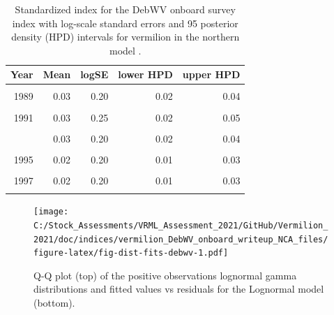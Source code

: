 \documentclass[11pt,
  english,
  a4paper,
]{article}
\begin{document}
\FloatBarrier

\begin{table}

\caption{\label{tab:tab-index-debwv}Standardized index for the DebWV onboard survey index with log-scale standard errors and 95%
       posterior density (HPD) intervals for vermilion in the northern model .}
\centering
\begin{tabular}[t]{rrrrr}
\toprule
Year & Mean & logSE & lower HPD & upper HPD\\
\midrule
\cellcolor{gray!6}{1988} & \cellcolor{gray!6}{0.02} & \cellcolor{gray!6}{0.22} & \cellcolor{gray!6}{0.01} & \cellcolor{gray!6}{0.03}\\
1989 & 0.03 & 0.20 & 0.02 & 0.04\\
\cellcolor{gray!6}{1990} & \cellcolor{gray!6}{0.06} & \cellcolor{gray!6}{0.23} & \cellcolor{gray!6}{0.04} & \cellcolor{gray!6}{0.10}\\
1991 & 0.03 & 0.25 & 0.02 & 0.05\\
\cellcolor{gray!6}{1992} & \cellcolor{gray!6}{0.02} & \cellcolor{gray!6}{0.20} & \cellcolor{gray!6}{0.01} & \cellcolor{gray!6}{0.03}\\
\addlinespace
1993 & 0.03 & 0.20 & 0.02 & 0.04\\
\cellcolor{gray!6}{1994} & \cellcolor{gray!6}{0.02} & \cellcolor{gray!6}{0.20} & \cellcolor{gray!6}{0.01} & \cellcolor{gray!6}{0.03}\\
1995 & 0.02 & 0.20 & 0.01 & 0.03\\
\cellcolor{gray!6}{1996} & \cellcolor{gray!6}{0.02} & \cellcolor{gray!6}{0.20} & \cellcolor{gray!6}{0.01} & \cellcolor{gray!6}{0.02}\\
1997 & 0.02 & 0.20 & 0.01 & 0.03\\
\addlinespace
\cellcolor{gray!6}{1998} & \cellcolor{gray!6}{0.02} & \cellcolor{gray!6}{0.20} & \cellcolor{gray!6}{0.01} & \cellcolor{gray!6}{0.03}\\
\bottomrule
\end{tabular}
\end{table}

\FloatBarrier

\begin{figure}
\centering
\texttt{[image: C:/Stock\_Assessments/VRML\_Assessment\_2021/GitHub/Vermilion\_2021/doc/indices/vermilion\_DebWV\_onboard\_writeup\_NCA\_files/figure-latex/fig-dist-fits-debwv-1.pdf]}
\caption{\label{fig:fig-dist-fits-debwv}Q-Q plot (top) of the positive observations lognormal gamma distributions and fitted values vs residuals for the Lognormal model (bottom).}
\end{figure}
\end{document}
